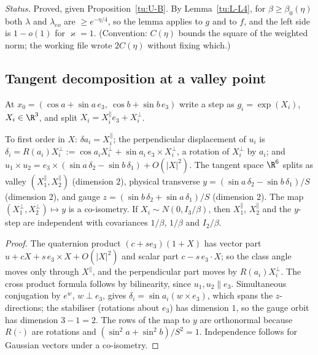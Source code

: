 \noindent\emph{Status.} Proved, given Proposition~\ref{tu:U-B}. By Lemma~\ref{tu:L-L4}, for
$\beta\ge\beta_0(\eta)$ both $\lambda$ and $\lambda_{eo}$ are $\ge e^{-\eta/4}$, so the lemma applies
to $g$ and to $f$, and the left side is $1-o(1)$ for $\varkappa=1$. (Convention: $C(\eta)$ bounds the
square of the weighted norm; the working file wrote $2C(\eta)$ without fixing which.)

\subsection{Tangent decomposition at a valley point}

At $x_0=(\cos a+\sin a\,e_3,\ \cos b+\sin b\,e_3)$ write a step as $g_i=\exp(X_i)$, $X_i\in\R^3$, and
split $X_i=X_i^\parallel e_3+X_i^\perp$.

\begin{lemma}\label{tu:L-tangent}
To first order in $X$: $\delta a_i=X_i^\parallel$; the perpendicular displacement of $u_i$ is
$\delta_i=R(a_i)X_i^\perp:=\cos a_iX_i^\perp+\sin a_i\,e_3\times X_i^\perp$, a rotation of $X_i^\perp$
by $a_i$; and $u_1\times u_2=e_3\times(\sin a\,\delta_2-\sin b\,\delta_1)+O(|X|^2)$. The tangent space
$\R^6$ splits as valley $(X_1^\parallel,X_2^\parallel)$ (dimension $2$), physical transverse
$y=(\sin a\,\delta_2-\sin b\,\delta_1)/S$ (dimension $2$), and gauge
$z=(\sin b\,\delta_2+\sin a\,\delta_1)/S$ (dimension $2$). The map $(X_1^\perp,X_2^\perp)\mapsto y$
is a co-isometry. If $X_i\sim N(0,I_3/\beta)$, then $X_1^\parallel$, $X_2^\parallel$ and the $y$-step are
independent with covariances $1/\beta$, $1/\beta$ and $I_2/\beta$.
\end{lemma}

\begin{proof}
The quaternion product $(c+s e_3)(1+X)$ has vector part $u+cX+s\,e_3\times X+O(|X|^2)$ and scalar part
$c-s\,e_3\cdot X$; so the class angle moves only through $X^\parallel$, and the perpendicular part moves
by $R(a_i)X_i^\perp$. The cross product formula follows by bilinearity, since $u_1,u_2\parallel e_3$.
Simultaneous conjugation by $e^{w}$, $w\perp e_3$, gives $\delta_i=\sin a_i(w\times e_3)$, which spans
the $z$-directions; the stabiliser (rotations about $e_3$) has dimension $1$, so the gauge orbit has
dimension $3-1=2$. The rows of the map to $y$ are orthonormal because $R(\cdot)$ are rotations and
$(\sin^2a+\sin^2b)/S^2=1$. Independence follows for Gaussian vectors under a co-isometry.
\end{proof}

